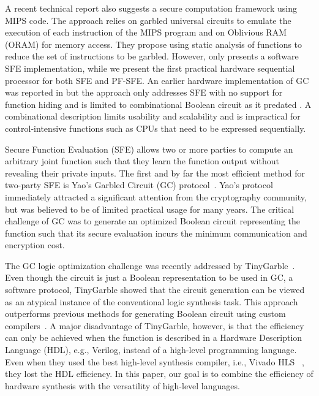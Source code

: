A recent technical report \cite{wang2016secure} also suggests a secure computation framework using MIPS code. The approach relies on garbled universal circuits to emulate the execution of each instruction of the MIPS program and on Oblivious RAM (ORAM) for memory access. They propose using static analysis of functions to reduce the set of instructions to be garbled. However, \cite{wang2016secure} only presents a software SFE implementation, while we present the first practical hardware sequential processor for both SFE and PF-SFE. An earlier hardware implementation of GC was reported in \cite{jarvinen2010garbled} but the approach only addresses SFE with no support for function hiding and is limited to combinational Boolean circuit as it predated \cite{songhori2015tinygarble}. A combinational description limits usability and scalability and is impractical for control-intensive functions such as CPUs that need to be expressed sequentially.


Secure Function Evaluation (SFE) allows two or more parties to compute an arbitrary joint function such that they learn the function output without revealing their private inputs.
The first and by far the most efficient method for two-party SFE is Yao's Garbled Circuit (GC) protocol~\cite{yao1986generate}.
Yao's protocol immediately attracted a significant attention from the cryptography community, but was believed to be of limited practical usage for many years.
The critical challenge of GC was to generate an optimized Boolean circuit representing the function such that its secure evaluation incurs the minimum communication and encryption cost.

The GC logic optimization challenge was recently addressed by TinyGarble~\cite{songhori2015tinygarble}.
Even though the circuit is just a Boolean representation to be used in GC, a software protocol, TinyGarble showed that the circuit generation can be viewed as an atypical instance of the conventional logic synthesis task.
This approach outperforms previous methods for generating Boolean circuit using custom compilers~\cite{malkhi2004fairplay,holzer2012secure, rastogi2014wysteria,demmler2015aby,liu2015oblivm,mood2016frigate}.
A major disadvantage of TinyGarble, however, is that the efficiency can only be achieved when the function is described in a Hardware Description Language (HDL), e.g., Verilog, instead of a high-level programming language.
Even when they used the best high-level synthesis compiler, i.e., Vivado HLS ~\cite{tool:Vivado}, they lost the HDL efficiency.
In this paper, our goal is to combine the efficiency of hardware synthesis with the versatility of high-level languages.

